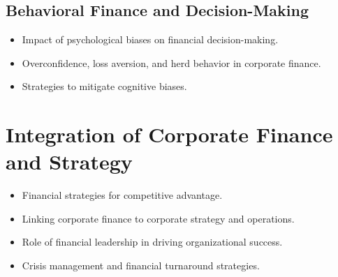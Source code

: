 \subsection{Behavioral Finance and Decision-Making}
\begin{itemize}
  \item Impact of psychological biases on financial decision-making.
  \item Overconfidence, loss aversion, and herd behavior in corporate finance.
  \item Strategies to mitigate cognitive biases.
\end{itemize}

\section{Integration of Corporate Finance and Strategy}
\begin{itemize}
  \item Financial strategies for competitive advantage.
  \item Linking corporate finance to corporate strategy and operations.
  \item Role of financial leadership in driving organizational success.
  \item Crisis management and financial turnaround strategies.
\end{itemize}

